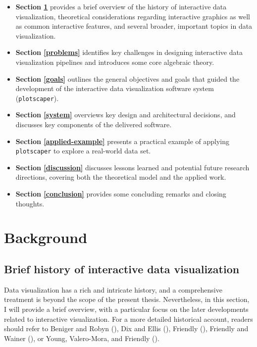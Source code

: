 \documentclass[
  openany]{book}
\providecommand{\tightlist}{%
  \setlength{\itemsep}{0pt}\setlength{\parskip}{0pt}}
\theoremstyle{definition}
\theoremstyle{definition}
\theoremstyle{definition}
\theoremstyle{definition}
\theoremstyle{remark}
\begin{document}
\begin{itemize}
\tightlist
\item
  \textbf{Section \ref{background}} provides a brief overview of the history of interactive data visualization, theoretical considerations regarding interactive graphics as well as common interactive features, and several broader, important topics in data visualization.
\item
  \textbf{Section \ref{problems}} identifies key challenges in designing interactive data visualization pipelines and introduces some core algebraic theory.
\item
  \textbf{Section \ref{goals}} outlines the general objectives and goals that guided the development of the interactive data visualization software system (\texttt{plotscaper}).
\item
  \textbf{Section \ref{system}} overviews key design and architectural decisions, and discusses key components of the delivered software.
\item
  \textbf{Section \ref{applied-example}} presents a practical example of applying \texttt{plotscaper} to explore a real-world data set.
\item
  \textbf{Section \ref{discussion}} discusses lessons learned and potential future research directions, covering both the theoretical model and the applied work.
\item
  \textbf{Section \ref{conclusion}} provides some concluding remarks and closing thoughts.
\end{itemize}

\chapter{Background}\label{background}

\section{Brief history of interactive data visualization}\label{brief-history}

Data visualization has a rich and intricate history, and a comprehensive treatment is beyond the scope of the present thesis. Nevertheless, in this section, I will provide a brief overview, with a particular focus on the later developments related to interactive visualization. For a more detailed historical account, readers should refer to Beniger and Robyn (), Dix and Ellis (), Friendly (), Friendly and Wainer (), or Young, Valero-Mora, and Friendly ().
\end{document}
